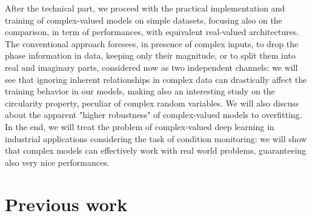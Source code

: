 \documentclass[../main.tex]{subfiles}
\begin{document}
After the technical part, we proceed with the practical implementation and training of complex-valued models on simple datasets, focusing also on the comparison, in term of performances, with equivalent real-valued architectures. The conventional approach foresees, in presence of complex inputs, to drop the phase information in data, keeping only their magnitude, or to split them into real and imaginary parts, considered now as two independent channels: we will see that ignoring inherent relationships in complex data can drastically affect the training behavior in our models, making also an interesting study on the circularity property, peculiar of complex random variables. We will also discuss about the apparent "higher robustness" of complex-valued models to overfitting.\\
In the end, we will treat the problem of complex-valued deep learning in industrial applications considering the task of condition monitoring: we will show that complex models can effectively work with real world problems, guaranteeing also very nice performances. 


\section{Previous work}
\end{document}
